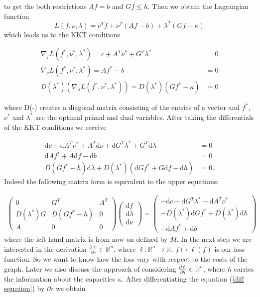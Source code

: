 \documentclass{article}
\begin{document}
to get the both restrictions $Af=b$ and $Gf\leq h$. Then we obtain the Lagrangian function
\[L(f, \nu, \lambda) = c^T f + \nu ^T (Af-b) + \lambda^T(Gf-\kappa)\]
which leads us to the KKT conditions

\begin{align*}
\nabla_f L(f^*,\nu^*, \lambda^*) = c + A^T \nu^*  + G^T\lambda^* &= 0 \\
\nabla _\nu L(f^*, \nu^*, \lambda^*) = Af^* - b &= 0 \\
D(\lambda^*) (\nabla_\lambda L(f^*, \nu^*, \lambda^*)) = D(\lambda^*)(Gf^*-\kappa) &= 0
\end{align*}

where D(-) creates a diagonal matrix consisting of the entries of a vector and $f^*$, $\nu^*$ and $\lambda^*$ are the optimal primal and dual variables. After taking the differentials of the KKT conditions we receive 

\begin{align*}
\mathrm{d}c + \mathrm{d}A^T \nu^* + A^T \mathrm{d}\nu + \mathrm{d}G^T \lambda^* + G^T\mathrm{d}\lambda &= 0 \\
\mathrm{d} A f^* + A\mathrm{d}f - \mathrm{d}b &=0 \\
D(Gf^*- h) \mathrm{d}\lambda + D(\lambda^*)(\mathrm{d}Gf^* + G\mathrm{d} f - \mathrm{d}h) &=0.
\end{align*}
Indeed the following matrix form is equivalent to the upper equations:

\begin{align}
\begin{pmatrix} 0 & G^T & A^T \\ D(\lambda^*) G & D(Gf^* -h) & 0 \\ A & 0 & 0 \end{pmatrix}
\begin{pmatrix} \mathrm{d} f \\ \mathrm{d} \lambda \\ \mathrm{d} \nu \end{pmatrix} = 
\begin{pmatrix} -\mathrm{d}c - \mathrm{d}G^T \lambda^* -\mathrm{d}A^T\nu^* \\ 
-D(\lambda^*)\mathrm d G f^* + D(\lambda^*)\mathrm d h \\
-\mathrm d A f^* + \mathrm d b \end{pmatrix} \label{diff equation}
\end{align}
where the left hand matrix is from now on defined by $M$.
In the next step we are interested in the derivation $\frac{\partial \ell}{\partial c}\in \mathbb R ^n$, where $\ell: \mathbb{R}^n \rightarrow \mathbb R,~f\mapsto \ell(f) $ is our loss function. So we want to know how the loss vary with respect to the costs of the graph. Later we also discuss the approach of considering $\frac{\partial \ell}{\partial h}\in \mathbb R^n$, where $h$ carries the information about the capacities $\kappa$. After differentiating the equation (\ref*{diff equation}) by $\partial c$ we obtain
\end{document}
